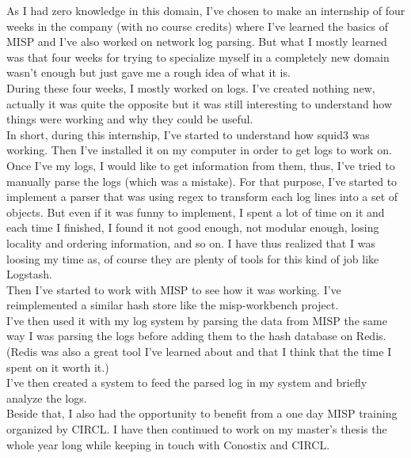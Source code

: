\documentclass{eplmastersthesis}
\begin{document}
As I had zero knowledge in this domain, I've chosen to make an internship of four weeks in the company (with no course credits) where I've learned the basics of MISP and I've also worked on network log parsing. But what I mostly learned was that four weeks for trying to specialize myself in a completely new domain wasn't enough but just gave me a rough idea of what it is.\\
During these four weeks, I mostly worked on logs. I've created nothing new, actually it was quite the opposite but it was still interesting to understand how things were working and why they could be useful. \\
In short, during this internship, I've started to understand how squid3 was working. Then I've installed it on my computer in order to get logs to work on.\\
Once I've my logs, I would like to get information from them, thus, I've tried to manually parse the logs (which was a mistake). For that purpose, I've started to implement a parser that was using regex to transform each log lines into a set of objects. But even if it was funny to implement, I spent a lot of time on it and each time I finished, I found it not good enough, not modular enough, losing locality and ordering information, and so on. I have thus realized that I was loosing my time as, of course they are plenty of tools for this kind of job like Logstash.\\
Then I've started to work with MISP to see how it was working. I've reimplemented a similar hash store like the misp-workbench project.\\
I've then used it with my log system by parsing the data from MISP the same way I was parsing the logs before adding them to the hash database on Redis.\\
(Redis was also a great tool I've learned about and that I think that the time I spent on it worth it.)\\
I've then created a system to feed the parsed log in my system and briefly analyze the logs.\\
Beside that, I also had the opportunity to benefit from a one day MISP training organized by CIRCL.
I have then continued to work on my master's thesis the whole year long while keeping in touch with Conostix and CIRCL.
\end{document}

